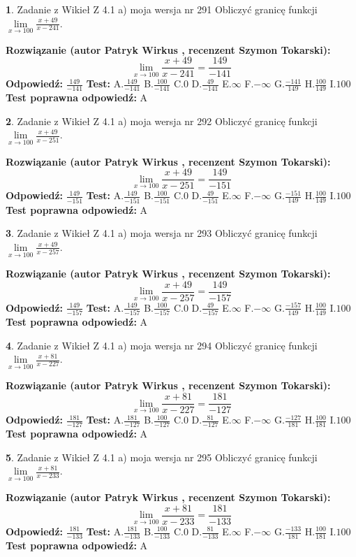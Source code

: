 \documentclass[12pt, a4paper]{article}
\theoremstyle{definition} %
\newtheorem{zad}{}
\newcommand{\zadStart}[1]{\begin{zad}#1\newline}
\newcommand{\zadStop}{\end{zad}}
\newcommand{\rozwStart}[2]{\noindent \textbf{Rozwiązanie (autor #1 , recenzent #2): }\newline}
\newcommand{\rozwStop}{\newline}
\newcommand{\odpStart}{\noindent \textbf{Odpowiedź:}\newline}
\newcommand{\odpStop}{\newline}
\newcommand{\testStart}{\noindent \textbf{Test:}\newline}
\newcommand{\testStop}{\newline}
\newcommand{\kluczStart}{\noindent \textbf{Test poprawna odpowiedź:}\newline}
\newcommand{\kluczStop}{\newline}
\begin{document}
\zadStart{Zadanie z Wikieł Z 4.1 a) moja wersja nr 291}
Obliczyć granicę funkcji $\lim\limits_{x\to100}\frac{x+49}{x-241}$.
\zadStop
\rozwStart{Patryk Wirkus}{Szymon Tokarski}
$$\lim\limits_{x\to100}\frac{x+49}{x-241} = \frac{149}{-141}$$
\rozwStop
\odpStart
$\frac{149}{-141}$
\odpStop
\testStart
A.$\frac{149}{-141}$
B.$\frac{100}{-141}$
C.$0$
D.$\frac{49}{-141}$
E.$\infty$
F.$-\infty$
G.$\frac{-141}{149}$
H.$\frac{100}{149}$
I.$100$
\testStop
\kluczStart
A
\kluczStop



\zadStart{Zadanie z Wikieł Z 4.1 a) moja wersja nr 292}
Obliczyć granicę funkcji $\lim\limits_{x\to100}\frac{x+49}{x-251}$.
\zadStop
\rozwStart{Patryk Wirkus}{Szymon Tokarski}
$$\lim\limits_{x\to100}\frac{x+49}{x-251} = \frac{149}{-151}$$
\rozwStop
\odpStart
$\frac{149}{-151}$
\odpStop
\testStart
A.$\frac{149}{-151}$
B.$\frac{100}{-151}$
C.$0$
D.$\frac{49}{-151}$
E.$\infty$
F.$-\infty$
G.$\frac{-151}{149}$
H.$\frac{100}{149}$
I.$100$
\testStop
\kluczStart
A
\kluczStop



\zadStart{Zadanie z Wikieł Z 4.1 a) moja wersja nr 293}
Obliczyć granicę funkcji $\lim\limits_{x\to100}\frac{x+49}{x-257}$.
\zadStop
\rozwStart{Patryk Wirkus}{Szymon Tokarski}
$$\lim\limits_{x\to100}\frac{x+49}{x-257} = \frac{149}{-157}$$
\rozwStop
\odpStart
$\frac{149}{-157}$
\odpStop
\testStart
A.$\frac{149}{-157}$
B.$\frac{100}{-157}$
C.$0$
D.$\frac{49}{-157}$
E.$\infty$
F.$-\infty$
G.$\frac{-157}{149}$
H.$\frac{100}{149}$
I.$100$
\testStop
\kluczStart
A
\kluczStop



\zadStart{Zadanie z Wikieł Z 4.1 a) moja wersja nr 294}
Obliczyć granicę funkcji $\lim\limits_{x\to100}\frac{x+81}{x-227}$.
\zadStop
\rozwStart{Patryk Wirkus}{Szymon Tokarski}
$$\lim\limits_{x\to100}\frac{x+81}{x-227} = \frac{181}{-127}$$
\rozwStop
\odpStart
$\frac{181}{-127}$
\odpStop
\testStart
A.$\frac{181}{-127}$
B.$\frac{100}{-127}$
C.$0$
D.$\frac{81}{-127}$
E.$\infty$
F.$-\infty$
G.$\frac{-127}{181}$
H.$\frac{100}{181}$
I.$100$
\testStop
\kluczStart
A
\kluczStop



\zadStart{Zadanie z Wikieł Z 4.1 a) moja wersja nr 295}
Obliczyć granicę funkcji $\lim\limits_{x\to100}\frac{x+81}{x-233}$.
\zadStop
\rozwStart{Patryk Wirkus}{Szymon Tokarski}
$$\lim\limits_{x\to100}\frac{x+81}{x-233} = \frac{181}{-133}$$
\rozwStop
\odpStart
$\frac{181}{-133}$
\odpStop
\testStart
A.$\frac{181}{-133}$
B.$\frac{100}{-133}$
C.$0$
D.$\frac{81}{-133}$
E.$\infty$
F.$-\infty$
G.$\frac{-133}{181}$
H.$\frac{100}{181}$
I.$100$
\testStop
\kluczStart
A
\kluczStop
\end{document}
